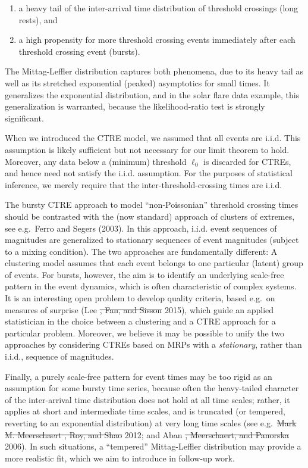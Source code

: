 \documentclass[]{elsarticle} %
\providecommand{\DIFaddtex}[1]{{\protect\color{blue}\uwave{#1}}} %
\providecommand{\DIFdeltex}[1]{{\protect\color{red}\sout{#1}}}                      %
\providecommand{\DIFaddbegin}{} %
\providecommand{\DIFaddend}{} %
\providecommand{\DIFdelbegin}{} %
\providecommand{\DIFdelend}{} %
\providecommand{\DIFadd}[1]{\texorpdfstring{\DIFaddtex{#1}}{#1}} %
\providecommand{\DIFdel}[1]{\texorpdfstring{\DIFdeltex{#1}}{}} %
\newcommand{\DIFscaledelfig}{0.5}
\newlength{\DIFdelgraphicswidth} %
\newlength{\DIFdelgraphicsheight} %
\newcommand{\DIFaddincludegraphics}[2][]{{\color{blue}\fbox{\DIFOincludegraphics[#1]{#2}}}} %
\newcommand{\DIFdelincludegraphics}[2][]{%
\sbox{\DIFdelgraphicsbox}{\DIFOincludegraphics[#1]{#2}}%
\settoboxwidth{\DIFdelgraphicswidth}{\DIFdelgraphicsbox} %
\settoboxtotalheight{\DIFdelgraphicsheight}{\DIFdelgraphicsbox} %
\scalebox{\DIFscaledelfig}{%
\parbox[b]{\DIFdelgraphicswidth}{\usebox{\DIFdelgraphicsbox}\\[-\baselineskip] \rule{\DIFdelgraphicswidth}{0em}}\llap{\resizebox{\DIFdelgraphicswidth}{\DIFdelgraphicsheight}{%
\setlength{\unitlength}{\DIFdelgraphicswidth}%
\begin{picture}(1,1)%
\thicklines\linethickness{2pt} %
{\color[rgb]{1,0,0}\put(0,0){\framebox(1,1){}}}%
{\color[rgb]{1,0,0}\put(0,0){\line( 1,1){1}}}%
{\color[rgb]{1,0,0}\put(0,1){\line(1,-1){1}}}%
\end{picture}%
}\hspace*{3pt}}} %
} %
\DeclareRobustCommand{\DIFaddbegin}{\DIFOaddbegin \let\includegraphics\DIFaddincludegraphics} %
\DeclareRobustCommand{\DIFaddend}{\DIFOaddend \let\includegraphics\DIFOincludegraphics} %
\DeclareRobustCommand{\DIFdelbegin}{\DIFOdelbegin \let\includegraphics\DIFdelincludegraphics} %
\DeclareRobustCommand{\DIFdelend}{\DIFOaddend \let\includegraphics\DIFOincludegraphics} %
\begin{document}
\begin{enumerate}
\def\labelenumi{\roman{enumi})}
\item
  a heavy tail of the inter-arrival time distribution of threshold
  crossings (long rests), and
\item
  a high propensity for more threshold crossing events immediately after
  each threshold crossing event (bursts).
\end{enumerate}

The Mittag-Leffler distribution captures both phenomena, due to its
heavy tail as well as its stretched exponential (peaked) asymptotics for
small times. It generalizes the exponential distribution, and in the
solar flare data example, this generalization is warranted, because the
likelihood-ratio test is strongly significant.

When we introduced the CTRE model, we assumed that all events are i.i.d.
This assumption is likely sufficient but not necessary for our limit
theorem to hold. Moreover, any data below a (minimum) threshold
\(\ell_0\) is discarded for CTREs, and hence need not satisfy the i.i.d.
assumption. For the purposes of statistical inference, we merely require
that the inter-threshold-crossing times are i.i.d.

The bursty CTRE approach to model ``non-Poissonian'' threshold crossing
times should be contrasted with the (now standard) approach of clusters
of extremes, see e.g.~Ferro and Segers (2003). In this approach, i.i.d.
event sequences of magnitudes are generalized to stationary sequences of
event magnitudes (subject to a mixing condition). The two approaches are
fundamentally different: A clustering model assumes that each event
belongs to one particular (latent) group of events. For bursts, however,
the aim is to identify an underlying scale-free pattern in the event
dynamics, which is often characteristic of complex systems. It is an
interesting open problem to develop quality criteria, based e.g.~on
measures of surprise (Lee \DIFdelbegin \DIFdel{, Fan, and Sisson }\DIFdelend \DIFaddbegin \DIFadd{et al., }\DIFaddend 2015), which guide an applied
statistician in the choice between a clustering and a CTRE approach for
a particular problem. Moreover, we believe it may be possible to unify
the two approaches by considering CTREs based on MRPs with a
\emph{stationary}, rather than i.i.d., sequence of magnitudes.

Finally, a purely scale-free pattern for event times may be too rigid as
an assumption for some bursty time series, because often the
heavy-tailed character of the inter-arrival time distribution does not
hold at all time scales; rather, it applies at short and intermediate
time scales, and is truncated (or tempered, reverting to an exponential
distribution) at very long time scales (see e.g.~\DIFdelbegin \DIFdel{Mark M. Meerschaert ,
Roy, and Shao }\DIFdelend \DIFaddbegin \DIFadd{Meerschaert et al.,
}\DIFaddend 2012; and Aban \DIFdelbegin \DIFdel{, Meerschaert, and Panorska }\DIFdelend \DIFaddbegin \DIFadd{et al., }\DIFaddend 2006). In such situations, a ``tempered''
Mittag-Leffler distribution may provide a more realistic fit, which we
aim to introduce in follow-up work.
\end{document}
